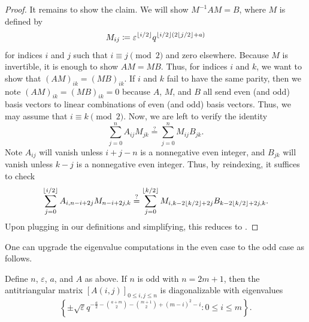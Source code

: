 \begin{proof}
    It remains to show the claim. We will show $M^{-1}AM=B$, where $M$ is defined by
    \[M_{ij}\coloneqq\varepsilon^{\left\lfloor{i/2}\right\rfloor}q^{\left\lfloor{i/2}\right\rfloor(2\left\lfloor{j/2}\right\rfloor+a)}\]
    for indices $i$ and $j$ such that $i\equiv j\pmod2$ and zero elsewhere. Because $M$ is invertible, it is enough to show $AM=MB$. Thus, for indices $i$ and $k$, we want to show that $(AM)_{ik}=(MB)_{ik}$. 
    If $i$ and $k$ fail to have the same parity, then we note $(AM)_{ik}=(MB)_{ik}=0$ because $A$, $M$, and $B$ all send even (and odd) basis vectors to linear combinations of even (and odd) basis vectors. Thus, we may assume that $i\equiv k\pmod2$. Now, we are left to verify the identity
    \[\sum_{j=0}^nA_{ij}M_{jk}\stackrel?=\sum_{j=0}^nM_{ij}B_{jk}.\]
    Note $A_{ij}$ will vanish unless $i+j-n$ is a nonnegative even integer, and $B_{jk}$ will vanish unless $k-j$ is a nonnegative even integer. Thus, by reindexing, it suffices to check
    \[\sum_{j=0}^{\left\lfloor{i/2}\right\rfloor}A_{i,n-i+2j}M_{n-i+2j,k}\stackrel?=\sum_{j=0}^{\left\lfloor{k/2}\right\rfloor}M_{i,k-2\left\lfloor{k/2}\right\rfloor+2j}B_{k-2\left\lfloor{k/2}\right\rfloor+2j,k}.\]
    Upon plugging in our definitions and simplifying, this reduces to .
\end{proof}
One can upgrade the eigenvalue computations in the even case to the odd case as follows.
\begin{proposition} \label{prop:helper-matrix-odd}
    Define $n$, $\varepsilon$, $a$, and $A$ as above. If $n$ is odd with $n=2m+1$, then the antitriangular matrix $[A(i,j)]_{0\le i,j\le n}$ is diagonalizable with eigenvalues
    \[\left\{\pm\sqrt\varepsilon q^{-\frac a2-\binom{a+m}2-\binom{m+1}2+(m-i)^2-i}:0\le i\le m\right\}.\]
\end{proposition}
